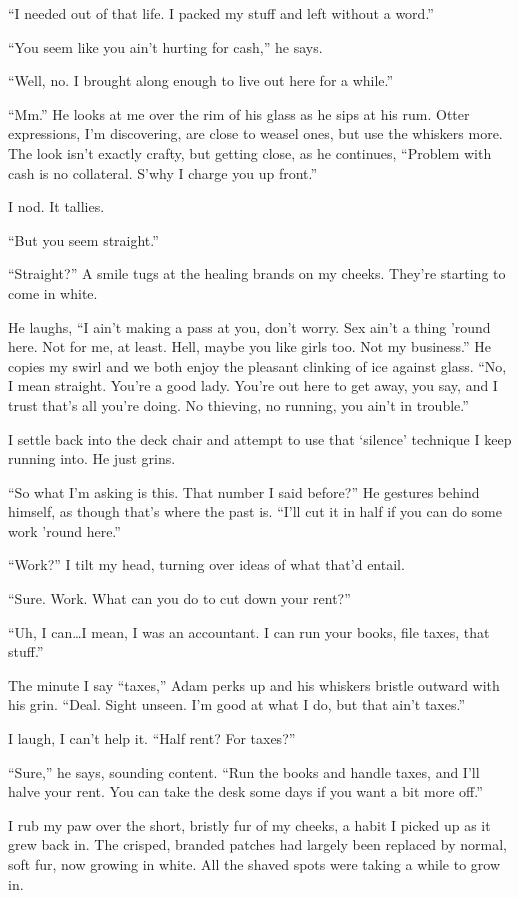 ``I needed out of that life. I packed my stuff and left without a word.''

``You seem like you ain't hurting for cash,'' he says.

``Well, no. I brought along enough to live out here for a while.''

``Mm.'' He looks at me over the rim of his glass as he sips at his rum. Otter expressions, I'm discovering, are close to weasel ones, but use the whiskers more. The look isn't exactly crafty, but getting close, as he continues, ``Problem with cash is no collateral. S'why I charge you up front.''

I nod. It tallies.

``But you seem straight.''

``Straight?'' A smile tugs at the healing brands on my cheeks. They're starting to come in white.

He laughs, ``I ain't making a pass at you, don't worry. Sex ain't a thing 'round here. Not for me, at least. Hell, maybe you like girls too. Not my business.'' He copies my swirl and we both enjoy the pleasant clinking of ice against glass. ``No, I mean straight. You're a good lady. You're out here to get away, you say, and I trust that's all you're doing. No thieving, no running, you ain't in trouble.''

I settle back into the deck chair and attempt to use that `silence' technique I keep running into. He just grins.

``So what I'm asking is this. That number I said before?'' He gestures behind himself, as though that's where the past is. ``I'll cut it in half if you can do some work 'round here.''

``Work?'' I tilt my head, turning over ideas of what that'd entail.

``Sure. Work. What can you do to cut down your rent?''

``Uh, I can\ldots{}I mean, I was an accountant. I can run your books, file taxes, that stuff.''

The minute I say ``taxes,'' Adam perks up and his whiskers bristle outward with his grin. ``Deal. Sight unseen. I'm good at what I do, but that ain't taxes.''

I laugh, I can't help it. ``Half rent? For taxes?''

``Sure,'' he says, sounding content. ``Run the books and handle taxes, and I'll halve your rent. You can take the desk some days if you want a bit more off.''

I rub my paw over the short, bristly fur of my cheeks, a habit I picked up as it grew back in. The crisped, branded patches had largely been replaced by normal, soft fur, now growing in white. All the shaved spots were taking a while to grow in.

